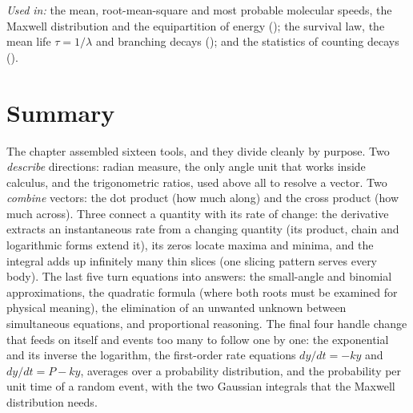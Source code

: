 \medskip\noindent
\emph{Used in:} the mean, root-mean-square and most probable molecular speeds, the Maxwell
distribution and the equipartition of energy (); the survival law, the mean life
$\tau=1/\lambda$ and branching decays (); and the statistics of counting decays ().

\section{Summary}\label{sec:summary0}
The chapter assembled sixteen tools, and they divide cleanly by purpose. Two \emph{describe}
directions: radian measure, the only angle unit that works inside calculus, and the trigonometric
ratios, used above all to resolve a vector. Two \emph{combine} vectors: the dot product (how much
along) and the cross product (how much across). Three connect a quantity with its rate of change: the derivative extracts an
instantaneous rate from a changing quantity (its product, chain and logarithmic forms extend it), its
zeros locate maxima and minima, and the integral adds up infinitely many thin slices (one slicing
pattern serves every body). The last five turn equations into answers: the small-angle and binomial
approximations, the quadratic formula (where both roots must be
examined for physical meaning), the elimination of an unwanted unknown between simultaneous equations,
and proportional reasoning. The final four handle change that feeds on itself and events too many to
follow one by one: the exponential and its inverse the logarithm, the first-order rate equations
$dy/dt=-ky$ and $dy/dt=P-ky$, averages over a probability distribution, and the probability per unit time
of a random event, with the two Gaussian integrals that the Maxwell distribution needs.

